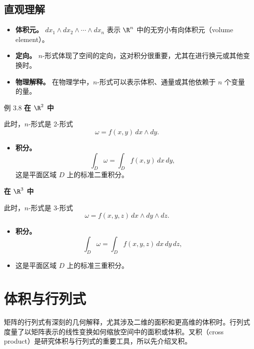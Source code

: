 \subsection{直观理解}
\begin{itemize}
\item \textbf{体积元。} $dx_1\wedge dx_2\wedge\cdots\wedge dx_n$ 表示 $\R^n$ 中的无穷小有向体积元（volume element）。
\item \textbf{定向。} $n$-形式体现了空间的定向，这对积分很重要，尤其在进行换元或其他变换时。
\item \textbf{物理解释。} 在物理学中，$n$-形式可以表示体积、通量或其他依赖于 $n$ 个变量的量。
\end{itemize}

\begin{statement}{例 3.8}{}
\noindent\textbf{在 $\R^2$ 中}\par
此时，$n$-形式是 2-形式
\[
  \omega=f(x,y)\,dx\wedge dy.
\]
\begin{itemize}
\item \textbf{积分。}
\[
  \int_D\omega=\int_Df(x,y)\,dx\,dy,
\]
这是平面区域 $D$ 上的标准二重积分。
\end{itemize}

\noindent\textbf{在 $\R^3$ 中}\par
此时，$n$-形式是 3-形式
\[
  \omega=f(x,y,z)\,dx\wedge dy\wedge dz.
\]
\begin{itemize}
\item \textbf{积分。}
\[
  \int_D\omega=\int_Df(x,y,z)\,dx\,dy\,dz,
\]
\item 这是平面区域 $D$ 上的标准三重积分。%
\end{itemize}
\end{statement}

\section{体积与行列式}
\label{sec:3.4}
矩阵的行列式有深刻的几何解释，尤其涉及二维的面积和更高维的体积时。行列式度量了以矩阵表示的线性变换如何缩放空间中的面积或体积。叉积（cross product）是研究体积与行列式的重要工具，所以先介绍叉积。

